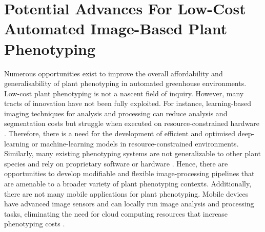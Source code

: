 \section{Potential Advances For Low-Cost Automated Image-Based Plant Phenotyping}
Numerous opportunities exist to improve the overall affordability and generalisability of plant phenotyping in automated greenhouse environments. Low-cost plant phenotyping is not a nascent field of inquiry. However, many tracts of innovation have not been fully exploited. For instance, learning-based imaging techniques for analysis and processing can reduce analysis and segmentation costs but struggle when executed on resource-constrained hardware \cite{nabwireReviewApplicationArtificial2021}. Therefore, there is a need for the development of efficient and optimised deep-learning or machine-learning models in resource-constrained environments. Similarly, many existing phenotyping systems are not generalizable to other plant species \cite{liReviewImagingTechniques2014, arvidssonGrowthPhenotypingPipeline2011a} and rely on proprietary software or hardware \cite{czedik-eysenbergPhenoBoxFlexibleAutomated2018}. Hence, there are opportunities to develop modifiable and flexible image-processing pipelines that are amenable to a broader variety of plant phenotyping contexts. Additionally, there are not many mobile applications for plant phenotyping. Mobile devices have advanced image sensors and can locally run image analysis and processing tasks, eliminating the need for cloud computing resources that increase phenotyping costs \cite{muller-linowPlantScreenMobile2019}.

\clearpage